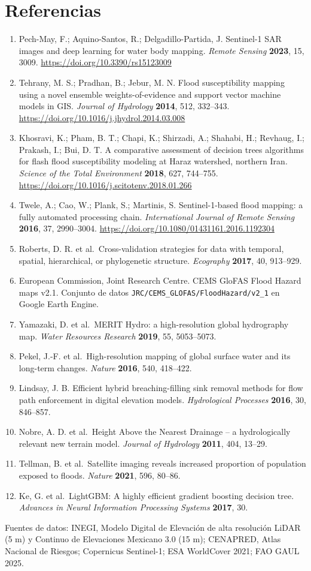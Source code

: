 \section*{Referencias}

\begin{enumerate}
\def\labelenumi{\arabic{enumi}.}
\tightlist
\item
  Pech-May, F.; Aquino-Santos, R.; Delgadillo-Partida, J. Sentinel-1 SAR images and deep learning for water body mapping. \emph{Remote Sensing} \textbf{2023}, 15, 3009. \url{https://doi.org/10.3390/rs15123009}
\item
  Tehrany, M. S.; Pradhan, B.; Jebur, M. N. Flood susceptibility mapping using a novel ensemble weights-of-evidence and support vector machine models in GIS. \emph{Journal of Hydrology} \textbf{2014}, 512, 332--343. \url{https://doi.org/10.1016/j.jhydrol.2014.03.008}
\item
  Khosravi, K.; Pham, B. T.; Chapi, K.; Shirzadi, A.; Shahabi, H.; Revhaug, I.; Prakash, I.; Bui, D. T. A comparative assessment of decision trees algorithms for flash flood susceptibility modeling at Haraz watershed, northern Iran. \emph{Science of the Total Environment} \textbf{2018}, 627, 744--755. \url{https://doi.org/10.1016/j.scitotenv.2018.01.266}
\item
  Twele, A.; Cao, W.; Plank, S.; Martinis, S. Sentinel-1-based flood mapping: a fully automated processing chain. \emph{International Journal of Remote Sensing} \textbf{2016}, 37, 2990--3004. \url{https://doi.org/10.1080/01431161.2016.1192304}
\item
  Roberts, D. R. et al.~Cross-validation strategies for data with temporal, spatial, hierarchical, or phylogenetic structure. \emph{Ecography} \textbf{2017}, 40, 913--929.
\item
  European Commission, Joint Research Centre. CEMS GloFAS Flood Hazard maps v2.1. Conjunto de datos \texttt{JRC/CEMS\_GLOFAS/FloodHazard/v2\_1} en Google Earth Engine.
\item
  Yamazaki, D. et al.~MERIT Hydro: a high-resolution global hydrography map. \emph{Water Resources Research} \textbf{2019}, 55, 5053--5073.
\item
  Pekel, J.-F. et al.~High-resolution mapping of global surface water and its long-term changes. \emph{Nature} \textbf{2016}, 540, 418--422.
\item
  Lindsay, J. B. Efficient hybrid breaching-filling sink removal methods for flow path enforcement in digital elevation models. \emph{Hydrological Processes} \textbf{2016}, 30, 846--857.
\item
  Nobre, A. D. et al.~Height Above the Nearest Drainage -- a hydrologically relevant new terrain model. \emph{Journal of Hydrology} \textbf{2011}, 404, 13--29.
\item
  Tellman, B. et al.~Satellite imaging reveals increased proportion of population exposed to floods. \emph{Nature} \textbf{2021}, 596, 80--86.
\item
  Ke, G. et al.~LightGBM: A highly efficient gradient boosting decision tree. \emph{Advances in Neural Information Processing Systems} \textbf{2017}, 30.
\end{enumerate}

Fuentes de datos: INEGI, Modelo Digital de Elevación de alta resolución LiDAR (5 m) y Continuo de Elevaciones Mexicano 3.0 (15 m); CENAPRED, Atlas Nacional de Riesgos; Copernicus Sentinel-1; ESA WorldCover 2021; FAO GAUL 2025.
